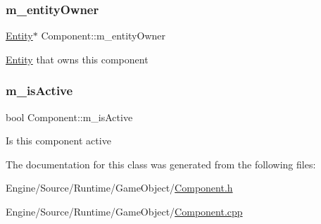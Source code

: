 \subsubsection{\texorpdfstring{m\+\_\+entity\+Owner}{m\_entityOwner}}
{\footnotesize\ttfamily \mbox{\hyperlink{class_entity}{Entity}}$\ast$ Component\+::m\+\_\+entity\+Owner\hspace{0.3cm}{\ttfamily [protected]}}

\mbox{\hyperlink{class_entity}{Entity}} that owns this component \mbox{\label{class_component_a6ed72c25c8ea738ebc5a69c66728bf60}} 
\subsubsection{\texorpdfstring{m\+\_\+is\+Active}{m\_isActive}}
{\footnotesize\ttfamily bool Component\+::m\+\_\+is\+Active\hspace{0.3cm}{\ttfamily [protected]}}

Is this component active 

The documentation for this class was generated from the following files\+:\begin{DoxyCompactItemize}
\item 
Engine/\+Source/\+Runtime/\+Game\+Object/\mbox{\hyperlink{_component_8h}{Component.\+h}}\item 
Engine/\+Source/\+Runtime/\+Game\+Object/\mbox{\hyperlink{_component_8cpp}{Component.\+cpp}}\end{DoxyCompactItemize}
